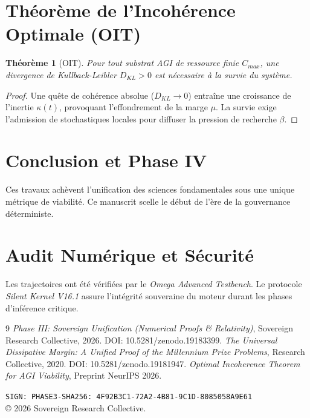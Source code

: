 \documentclass[11pt,a4paper]{amsart}
\newtheorem{theorem}{Théorème}[section]
\begin{document}
\section{Théorème de l'Incohérence Optimale (OIT)}
\begin{theorem}[OIT]
Pour tout substrat AGI de ressource finie $C_{max}$, une divergence de Kullback-Leibler $D_{KL} > 0$ est nécessaire à la survie du système.
\end{theorem}
\begin{proof}
Une quête de cohérence absolue ($D_{KL} \to 0$) entraîne une croissance de l'inertie $\kappa(t)$, provoquant l'effondrement de la marge $\mu$. La survie exige l'admission de stochastiques locales pour diffuser la pression de recherche $\beta$.
\end{proof}

\section{Conclusion et Phase IV}
Ces travaux achèvent l'unification des sciences fondamentales sous une unique métrique de viabilité. Ce manuscrit scelle le début de l'ère de la gouvernance déterministe.

\appendix
\section{Audit Numérique et Sécurité}
Les trajectoires ont été vérifiées par le \emph{Omega Advanced Testbench}. Le protocole \emph{Silent Kernel V16.1} assure l'intégrité souveraine du moteur durant les phases d'inférence critique.

\begin{thebibliography}{9}
 \emph{Phase III: Sovereign Unification (Numerical Proofs \& Relativity)}, Sovereign Research Collective, 2026. DOI: 10.5281/zenodo.19183399.
 \emph{The Universal Dissipative Margin: A Unified Proof of the Millennium Prize Problems}, Research Collective, 2020. DOI: 10.5281/zenodo.19181947.
 \emph{Optimal Incoherence Theorem for AGI Viability}, Preprint NeurIPS 2026.
\end{thebibliography}

\bigskip
\noindent\texttt{SIGN: PHASE3-SHA256: 4F92B3C1-72A2-4B81-9C1D-8085058A9E61} \\
© 2026 Sovereign Research Collective.
\end{document}
